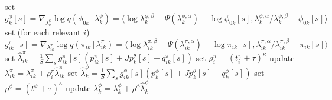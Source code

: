 \documentclass{article}
\newcommand{\g}{\, | \,}
\begin{document}
\begin{algorithm}[h]
\begin{algorithmic}[1]
			\State set $g^\phi_k[s] = \nabla_{\lambda^\phi_{k}} \log q(\phi_{0k} \g \lambda^\phi_{k}) = \langle \log \lambda^{\phi,\beta}_k - \Psi( \lambda^{\phi,\alpha}_k) + \log \phi_{0k}[s], \lambda^{\phi,\alpha}_k / \lambda^{\phi,\beta}_k - \phi_{0k}[s] \rangle$ 
			\State set (for each relevant $i$) $g^\pi_{ik}[s] = \nabla_{\lambda^\pi_{ik}} \log q(\pi_{ik} \g \lambda^\pi_{ik}) = \langle \log \lambda^{\pi,\beta}_{ik} - \Psi(\lambda^{\pi,\alpha}_{ik}) + \log \pi_{ik}[s], \lambda^{\pi,\alpha}_{ik}  / \lambda^{\pi,\beta}_{ik} - \pi_{ik}[s] \rangle$
		\EndFor
	\EndFor
	\For {each event $i$ on date $a_i \in \left( c_j - d, c_j \right]$}
		\State set $\hat\lambda^{\pi}_{ik} = \frac{1}{S}\sum_s g^\pi_{ik}[s] ( p^\pi_{ik}[s] + J p^\theta_k[s] -  q^\pi_{ik}[s] ) $
		\State set $\rho^\pi_i = (t^\pi_i + \tau)^\kappa$
		\State update $\lambda^{\pi}_{ik} = \lambda^{\pi}_{ik} + \rho^\pi_i \hat\lambda^{\pi}_{ik} $
	\EndFor
	\State set $\hat\lambda^{\phi}_{k} = \frac{1}{S}\sum_s g^\phi_{ik}[s] ( p^\phi_{k}[s] + J p^\theta_k[s] -  q^\phi_{k}[s] ) $
	\State set $\rho^\phi = (t^\phi +\tau)^\kappa$
	\State update $\lambda^{\phi}_{k} = \lambda^{\phi}_{k} + \rho^\phi \hat\lambda^{\phi}_{k}$
\end{algorithmic}
\end{algorithm}



%
\end{document}
